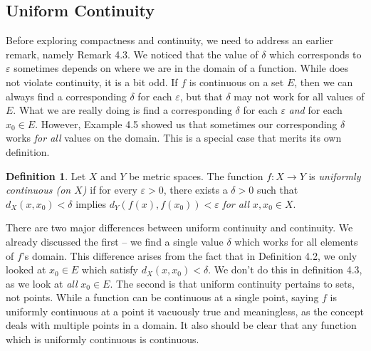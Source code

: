 \documentclass{article}
\theoremstyle{definition}
\newtheorem{definition}{Definition}[section]
\begin{document}
	\subsection{Uniform Continuity}
	Before exploring compactness and continuity, we need to address an earlier remark, namely Remark 4.3. We noticed that the value of $ \delta $ which corresponds to $ \varepsilon $ sometimes depends on where we are in the domain of a function. While does not violate continuity, it is a bit odd. If $ f $ is continuous on a set $ E $, then we can always find a corresponding $ \delta $ for each $ \varepsilon $, but that $ \delta $ may not work for all values of $ E $. What we are really doing is find a corresponding $ \delta $ for each $ \varepsilon $ \textit{and} for each $ x_0\in E $. However, Example 4.5 showed us that sometimes our corresponding $ \delta $ works \textit{for all} values on the domain. This is a special case that merits its own definition. 
	\begin{definition}\label{def4.3}
		Let $ X $ and $ Y $ be metric spaces. The function $ f:X\to Y $ is \textit{\color{red}uniformly continuous (on $ X $)} if for every $ \varepsilon>0 $, there exists a $ \delta>0 $ such that $d_X(x,x_0)<\delta $ implies $  d_Y(f(x),f(x_0))<\varepsilon$ \textit{for all} $ x,x_0\in X $. 
	\end{definition}
	There are two major differences between uniform continuity and continuity. We already discussed the first -- we find a single value $ \delta $ which works for all elements of $ f $'s domain. This difference arises from the fact that in Definition 4.2, we only looked at $ x_0\in E $ which satisfy $ d_X(x,x_0)<\delta $. We don't do this in definition 4.3, as we look at \textit{all} $ x_0\in E $. The second is that uniform continuity pertains to sets, not points. While a function can be continuous at a single point, saying $ f $ is uniformly continuous at a point it vacuously true and meaningless, as the concept deals with multiple points in a domain. It also should be clear that any function which is uniformly continuous is continuous. 
	
\end{document}
